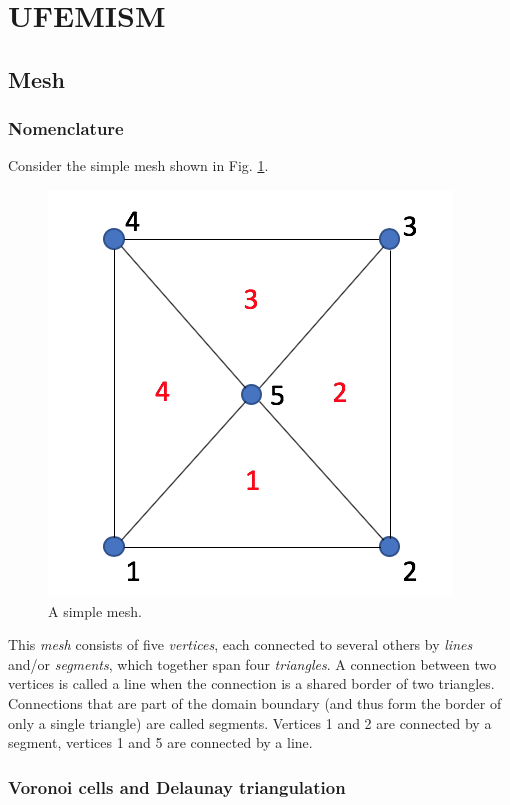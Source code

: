 \documentclass{article}
\begin{document}
\newpage
\section{UFEMISM}

\subsection{Mesh}

\subsubsection{Nomenclature}

Consider the simple mesh shown in Fig. \ref{fig:dummymesh}.

\begin{figure}[h!] \label{fig:dummymesh}
  \includegraphics[width=0.3\linewidth]{Fig_dummymesh_02.png}
  \caption{A simple mesh.}
\end{figure}

This \emph{mesh} consists of five \emph{vertices}, each connected to several others by \emph{lines} and/or \emph{segments}, which together span four \emph{triangles}. A connection between two vertices is called a line when the connection is a shared border of two triangles. Connections that are part of the domain boundary (and thus form the border of only a single triangle) are called segments. Vertices 1 and 2 are connected by a segment, vertices 1 and 5 are connected by a line.

\subsubsection{Voronoi cells and Delaunay triangulation}
\end{document}
